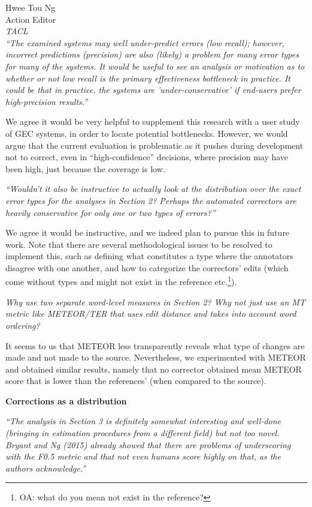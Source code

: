 \documentclass[11pt,letterpaper]{letter}
\newcommand{\oa}[1]{\footnote{\color{red}OA: #1}}
\begin{document}
\begin{letter}{%
Hwee Tou Ng\\
Action Editor\\
{\em TACL}\\
}
\emph{``The examined systems may well under-predict errors (low recall); however,
	incorrect predictions (precision) are also (likely) a problem for many error
	types for many of the systems. It would be useful to see an analysis or
	motivation as to whether or not low recall is the primary effectiveness
	bottleneck in practice. It could be that in practice, the systems are
	'under-conservative' if end-users prefer high-precision results.''
	}

We agree it would be very helpful to supplement this research with a user study of GEC systems, in order to locate potential bottlenecks. However, we would argue that the current evaluation is problematic as it pushes during development not to correct, even in ``high-confidence'' decisions, where precision may have been high, just because the coverage is low. 

\emph{``Wouldn't it also be instructive to actually look at the distribution
	over the exact error types for the analyses in Section 2? Perhaps the automated correctors are heavily conservative for only one or two types of errors?''
	}
	
We agree it would be instructive, and we indeed plan to pursue this in future work. Note that there are several methodological issues to be resolved to implement this, such as defining what constitutes a type where the annotators disagree with one another, and how to categorize the correctors' edits (which come without types and might not exist in the reference etc.\oa{what do you mean not exist in the reference?}).
	
\emph{Why use two separate word-level measures in Section 2? Why not just use
	an MT metric like METEOR/TER that uses edit distance and takes into account
	word ordering?}

It seems to us that METEOR less transparently reveals what type of changes are made and not made to the source. Nevertheless, we experimented with METEOR and obtained similar results, namely that no corrector obtained mean METEOR score that is lower than the references' (when compared to the source).

{\bf Corrections as a distribution}

\emph{``The analysis in Section 3 is definitely somewhat interesting and
	well-done (bringing in estimation procedures from a different field) but not
	too novel. Bryant and Ng (2015) already showed that there are problems of
	underscoring with the F0.5 metric and that not even humans score highly on
	that, as the authors acknowledge.''
	}
	

\end{letter}
\end{document}
